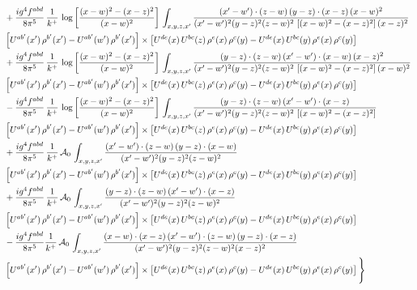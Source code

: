 \documentclass[10pt]{article}
\numberwithin{equation}{section}
\begin{document}
\begin{align}
&  +\frac{ig^{4}f^{abd}}{8\pi^{5}}\,\frac{1}{k^{+}}\,\log{\left[\frac{(x-w)^{2}-(x-z)^{2}}{(x-w)^{2}}\right]}\,\int_{x,y,z,x'}
\frac{(x'-w')\cdot(z-w)\,(y-z)\cdot(x-z)\,(x-w)^{2}}{(x'-w')^{2}(y-z)^{2}(z-w)^{2}\,\left[(x-w)^{2}-(x-z)^{2}\right](x-z)^{2}}\notag \\ & \left[U^{ab'}(x')\,\rho^{b'}(x')-U^{ab'}(w')\, \rho^{b'}(x')\right]\times \left[U^{de}(x)\,U^{bc}(z)\, \rho^{e}(x)\,\rho^{c}(y)-U^{de}(x)\,U^{bc}(y)\,\rho^{e}(x)\,\rho^{c}(y)\right] \notag \\
& +\frac{ig^{4}f^{abd}}{8\pi^{5}}\,\frac{1}{k^{+}}\,\log{\left[\frac{(x-w)^{2}-(x-z)^{2}}{(x-w)^{2}}\right]}\,\int_{x,y,z,x'}
\frac{(y-z)\cdot(z-w)\,(x'-w')\cdot(x-w)\,(x-z)^{2}}{(x'-w')^{2}(y-z)^{2}(z-w)^{2}\,\left[(x-w)^{2}-(x-z)^{2}\right](x-w)^{2}}\notag \\ 
& \left[U^{ab'}(x')\,\rho^{b'}(x')-U^{ab'}(w')\, \rho^{b'}(x')\right]\times \left[U^{de}(x)\,U^{bc}(z)\, \rho^{e}(x)\,\rho^{c}(y)-U^{de}(x)\,U^{bc}(y)\,\rho^{e}(x)\,\rho^{c}(y)\right] \notag \\
& -\frac{ig^{4}f^{abd}}{8\pi^{5}}\,\frac{1}{k^{+}}\,\log{\left[\frac{(x-w)^{2}-(x-z)^{2}}{(x-w)^{2}}\right]}\,\int_{x,y,z,x'}
\frac{(y-z)\cdot(z-w)\,(x'-w')\cdot(x-z)}{(x'-w')^{2}(y-z)^{2}(z-w)^{2}\,\left[(x-w)^{2}-(x-z)^{2}\right]}\notag \\ & \left[U^{ab'}(x')\,\rho^{b'}(x')-U^{ab'}(w')\, \rho^{b'}(x')\right]\times \left[U^{de}(x)\,U^{bc}(z)\, \rho^{e}(x)\,\rho^{c}(y)-U^{de}(x)\,U^{bc}(y)\,\rho^{e}(x)\,\rho^{c}(y)\right] \notag \\
& +\frac{ig^{4}f^{abd}}{8\pi^{5}}\,\frac{1}{k^{+}}\,\mathcal{A}_{0}\,\int_{x,y,z,x'}
\frac{(x'-w')\cdot(z-w)\,(y-z)\cdot(x-w)}{(x'-w')^{2}(y-z)^{2}(z-w)^{2}}\notag \\
& \left[U^{ab'}(x')\,\rho^{b'}(x')-U^{ab'}(w')\, \rho^{b'}(x')\right]\times \left[U^{de}(x)\,U^{bc}(z)\, \rho^{e}(x)\,\rho^{c}(y)-U^{de}(x)\,U^{bc}(y)\,\rho^{e}(x)\,\rho^{c}(y)\right] \notag \\
& +\frac{ig^{4}f^{abd}}{8\pi^{5}}\,\frac{1}{k^{+}}\,\mathcal{A}_{0}\,\int_{x,y,z,x'}
\frac{(y-z)\cdot(z-w)\,(x'-w')\cdot(x-z)}{(x'-w')^{2}(y-z)^{2}(z-w)^{2}}\notag \\ & \left[U^{ab'}(x')\,\rho^{b'}(x')-U^{ab'}(w')\, \rho^{b'}(x')\right]\times \left[U^{de}(x)\,U^{bc}(z)\, \rho^{e}(x)\,\rho^{c}(y)-U^{de}(x)\,U^{bc}(y)\,\rho^{e}(x)\,\rho^{c}(y)\right] \notag \\
& -\frac{ig^{4}f^{abd}}{8\pi^{5}}\frac{1}{k^{+}}\,\mathcal{A}_{0}\,\int_{x,y,z,x'}
\frac{(x-w)\cdot(x-z)\,(x'-w')\cdot(z-w)\,(y-z)\cdot(x-z)}{(x'-w')^{2}(y-z)^{2}(z-w)^{2}(x-z)^{2}}\notag \\ & \left[U^{ab'}(x')\,\rho^{b'}(x')-U^{ab'}(w')\, \rho^{b'}(x')\right]\times \left[U^{de}(x)\,U^{bc}(z)\, \rho^{e}(x)\,\rho^{c}(y)-U^{de}(x)\,U^{bc}(y)\,\rho^{e}(x)\,\rho^{c}(y)\right]\Bigg\} \label{eq:F:G1IIIN3a}
\end{align}
\end{document}
